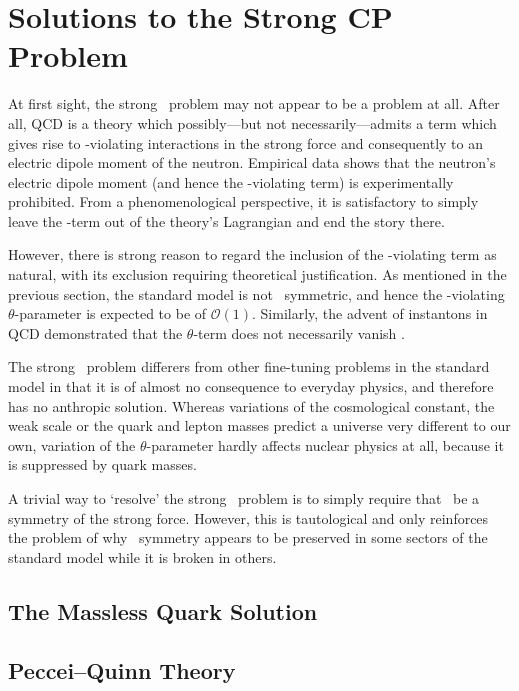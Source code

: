 \chapter{Solutions to the Strong CP Problem}

At first sight, the strong \CP\ problem may not appear to be a problem at all.
After all, QCD is a theory which possibly---but not necessarily---admits a term which gives rise to \CP-violating interactions in the strong force and consequently to an electric dipole moment of the neutron.
Empirical data shows that the neutron's electric dipole moment (and hence the \CP-violating term) is experimentally prohibited.
From a phenomenological perspective, it is satisfactory to simply leave the \CP-term out of the theory's Lagrangian and end the story there.

However, there is strong reason to regard the inclusion of the \CP-violating term as natural, with its exclusion requiring theoretical justification.
As mentioned in the previous section, the standard model is not \CP\ symmetric, and hence the \CP-violating $\theta$-parameter is expected to be of $\mathcal{O}(1)$.
Similarly, the advent of instantons in QCD demonstrated that the $\theta$-term does not necessarily vanish \cite{lectures-on-instantons,instantons-whats-happening}.

The strong \CP\ problem differers from other fine-tuning problems in the standard model  in that it is of almost no consequence to everyday physics, and therefore has no anthropic solution.
Whereas variations of the cosmological constant, the weak scale or the quark and lepton masses predict a universe very different to our own, variation of the $\theta$-parameter hardly affects nuclear physics at all, because it is suppressed by quark masses.

A trivial way to `resolve' the strong \CP\ problem is to simply require that \CP\ be a symmetry of the strong force.
However, this is tautological and only reinforces the problem of why \CP\ symmetry appears to be preserved in some sectors of the standard model while it is broken in others.



\section{The Massless Quark Solution}

\section{Peccei--Quinn Theory}

